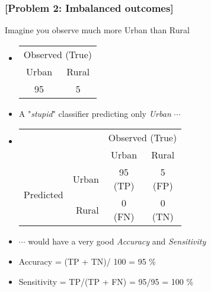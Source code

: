 \documentclass[xcolor=x11names,compress, handhouts]{beamer}
\renewcommand{\(}{\begin{columns}}
\renewcommand{\)}{\end{columns}}
\newcommand{\<}[1]{\begin{column}{#1}}
\renewcommand{\>}{\end{column}}
\begin{document}
\begin{frame} %
\frametitle{\textcolor{brique}{[Problem 2: Imbalanced outcomes]}}
Imagine you observe much more Urban than Rural
\begin{itemize}[<+->]
 \item[]
    \begin{table}[]
    \begin{tabular}{|c|c|}

     \multicolumn{2}{c}{Observed (True)}                                                                                          \\
      Urban  &  Rural  \\  \hline
      95     & 5       \\  \hline
    \end{tabular}
    \end{table}
  \item A "\textit{stupid}" classifier predicting only \textit{Urban} $\cdots$
  \item[]
    \begin{table}[]
    \begin{tabular}{l r|c|c|}

                              & & \multicolumn{2}{c|}{Observed (True)}                                                                                          \\
                              & &    Urban  &  Rural  \\  \hline
    \multirow{2}{*}{Predicted}& Urban & \shortstack[c]{95 \\ \tiny{(TP)}}& \shortstack[c]{5 \\ \tiny{(FP)}} \\ \cline{2-4}
                              & Rural &  \shortstack[c]{0 \\ \tiny{(FN)}}& \shortstack[c]{0 \\ \tiny{(TN)}} \\ \hline
    \end{tabular}
    \end{table}
  \item[] $\cdots$ would have a very good \textit{Accuracy} and \textit{Sensitivity}
  \item[] Accuracy = (TP + TN)/ 100 = 95 \%
  \item[] Sensitivity = TP/(TP + FN) = 95/95 = 100 \%
\end{itemize}
\end{frame}
\end{document}
